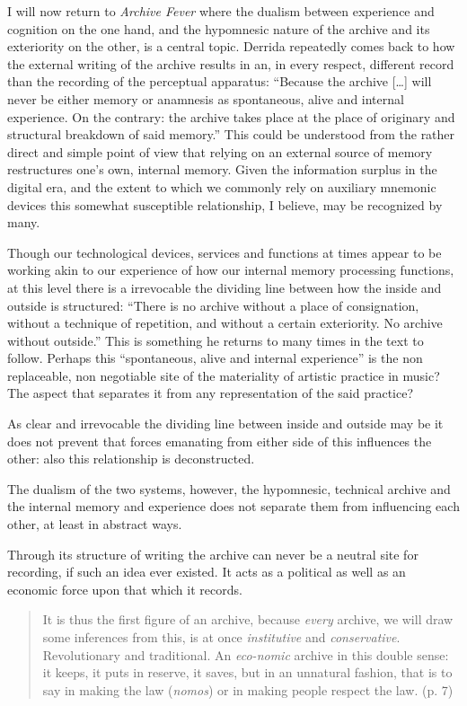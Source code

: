 I will now return to \emph{Archive Fever} where the dualism between experience and cognition on the one hand, and the hypomnesic nature of the archive and its exteriority on the other, is a central topic. Derrida repeatedly comes back to how the external writing of the archive results in an, in every respect, different record than the recording of the perceptual apparatus: ``Because the archive [\ldots] will never be either memory or anamnesis as spontaneous, alive and internal experience. On the contrary: the archive takes place at the place of originary and structural breakdown of said memory.'' \citep[p. 11]{derrida1998} This could be understood from the rather direct and simple point of view that relying on an external source of memory restructures one's own, internal memory. Given the information surplus in the digital era, and the extent to which we commonly rely on auxiliary mnemonic devices this somewhat susceptible relationship, I believe, may be recognized by many. 

Though our technological devices, services and functions at times appear to be working akin to our experience of how our internal memory processing functions, at this level there is a irrevocable the dividing line between how the inside and outside is structured: ``There is no archive without a place of consignation, without a technique of repetition, and without a certain exteriority. No archive without outside.'' \citep[p. 11]{derrida1998} This is something he returns to many times in the text to follow. Perhaps this ``spontaneous, alive and internal experience'' is the non replaceable, non negotiable site of the materiality of artistic practice in music? The aspect that separates it from any representation of the said practice?

As clear and irrevocable the dividing line between inside and outside may be it does not prevent that forces emanating from either side of this influences the other: also this relationship is deconstructed.

The dualism of the two systems, however, the hypomnesic, technical archive and the internal memory and experience does not separate them from influencing each other, at least in abstract ways. 

Through its structure of writing the archive can never be a neutral site for recording, if such an idea ever existed. It acts as a political as well as an economic force upon that which it records.

\begin{quote}
  It is thus the first figure of an archive, because \emph{every} archive, we will draw some inferences from this, is at once \emph{institutive} and \emph{conservative}. Revolutionary and traditional. An \emph{eco-nomic} archive in this double sense: it keeps, it puts in reserve, it saves, but in an unnatural fashion, that is to say in making the law (\emph{nomos}) or in making people respect the law. (p. 7)
\end{quote}





